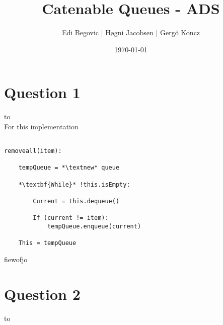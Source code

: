 \documentclass[a4paper]{article}
\title{Catenable Queues - ADS}
\author{Edi Begovic | Høgni Jacobsen | Gergö Koncz}
\date{\today}
\def\headline#1{\hbox to \hsize{\hrulefill\quad\lower.3em\hbox{#1}\quad\hrulefill}}
\begin{document}
 
\maketitle

\section*{Question 1}
\headline{-} \ \\

\noindent
For this implementation 

\begin{lstlisting}[escapeinside={{*}{*}}]

removeall(item):

    tempQueue = *\textnew* queue

    *\textbf{While}* !this.isEmpty:

        Current = this.dequeue()
        
        If (current != item):
            tempQueue.enqueue(current)
    
    This = tempQueue

\end{lstlisting}
fiewofjo


\section*{Question 2}
\headline{-} \ \\
\end{document}
